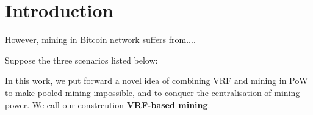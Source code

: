 \section{Introduction}




However, mining in Bitcoin network suffers from....




Suppose the three scenarios listed below:






In this work, we put forward a novel idea of combining VRF and mining in PoW to make pooled mining impossible, and to conquer the centralisation of mining power.
We call our constrcution \textbf{VRF-based mining}.